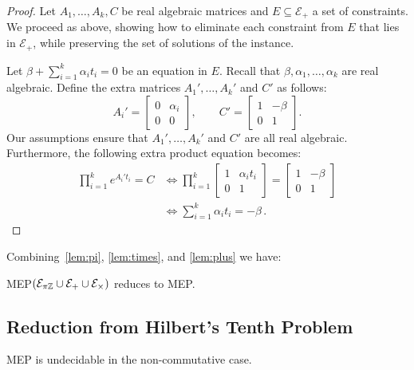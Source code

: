 \begin{proof}
  Let $A_1,\ldots,A_k,C$ be real algebraic matrices and
  $E \subseteq\mathcal{E}_{+}$ a set of constraints.
  We proceed as above, showing how to eliminate each constraint from
  $E$ that lies in $\mathcal{E}_{+}$, while preserving the set of
  solutions of the instance.

Let $\beta+\sum_{i=1}^{k} \alpha_{i} t_{i}=0$ be an equation in $E$.
Recall that $\beta,\alpha_1,\ldots,\alpha_k$ are real algebraic.
Define the extra matrices $A_1',\ldots,A_k'$ and $C'$ as follows:
\[A_i'=
\begin{bmatrix}
  0&\alpha_{i} \\
  0&0
\end{bmatrix},
\qquad C'=\begin{bmatrix}
1&-\beta \\
0&1\end{bmatrix}.
\]
Our assumptions ensure that $A_1',\ldots,A_k'$ and $C'$ are all real algebraic.
Furthermore, the following extra product equation becomes:
\begin{align*}
\prod_{i=1}^{k} e^{A_i't_{i}}=C &\Leftrightarrow
\prod_{i=1}^{k}\begin{bmatrix}
1&\alpha_{i} t_{i} \\
0&1
\end{bmatrix}=\begin{bmatrix}
1&-\beta \\
0&1
\end{bmatrix}\\
&\Leftrightarrow\sum_{i=1}^{k}\alpha_{i} t_{i}=-\beta \, .
\end{align*}
\end{proof}

Combining~\cref{lem:pi}, \cref{lem:times}, and \cref{lem:plus} we
have:
\begin{proposition}
  MEP$(\mathcal{E}_{\pi\mathbb{Z}}\cup\mathcal{E}_{+}\cup\mathcal{E}_{\times})$
  reduces to MEP\@.
\end{proposition}

\subsection{Reduction from Hilbert's Tenth Problem}

\begin{theorem}
  MEP is undecidable in the non-commutative case.
\end{theorem}

